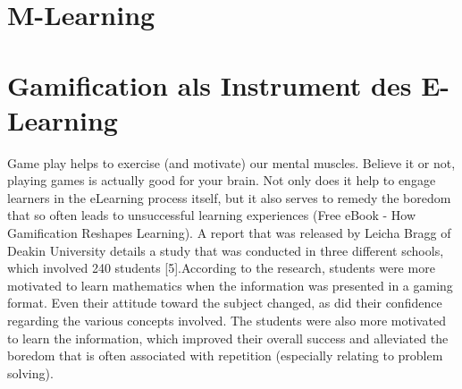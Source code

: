 \documentclass[a4paper, 12pt, twoside, BCOR=20mm, DIV=calc, abstracton, parskip=half*, toc=bibliography, toc=listof, headsepline, footsepline, headings=small, numbers=enddot]{scrreprt}
\begin{document}
	\section{M-Learning}
	
	\section{Gamification als Instrument des E-Learning}
Game play helps to exercise (and motivate) our mental muscles.
Believe it or not, playing games is actually good for your brain. Not only does it help to engage learners in the eLearning process itself, but it also serves to remedy the boredom that so often leads to unsuccessful learning experiences (Free eBook - How Gamification Reshapes Learning). A report that was released by Leicha Bragg of Deakin University details a study that was conducted in three different schools, which involved 240 students [5].According to the research, students were more motivated to learn mathematics when the information was presented in a gaming format. Even their attitude toward the subject changed, as did their confidence regarding the various concepts involved. The students were also more motivated to learn the information, which improved their overall success and alleviated the boredom that is often associated with repetition (especially relating to problem solving).\cite{BrainFact}	
	
\end{document}
